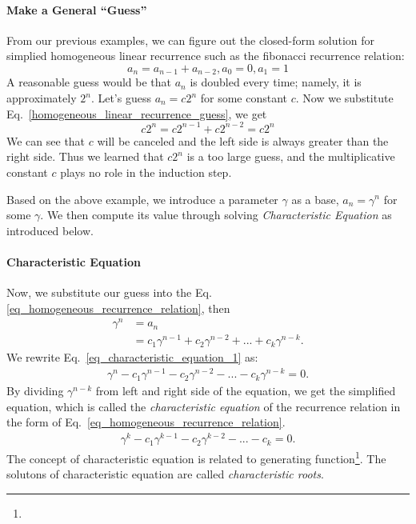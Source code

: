 \documentclass[../main.tex]{subfiles}
\begin{document}
\paragraph{Make a General ``Guess''} From our previous examples, we can figure out the closed-form solution for simplied homogeneous linear recurrence such as the fibonacci recurrence relation:
\begin{equation}
a_n = a_{n-1}+a_{n-2}, a_0=0, a_1=1
\label{homogeneous_linear_recurrence_guess}
\end{equation}
A reasonable guess would be that $a_n$ is doubled every time; namely, it is approximately $2^n$. Let's guess $a_n=c2^n$ for some constant $c$. Now we substitute Eq.~\ref{homogeneous_linear_recurrence_guess}, we get
\begin{equation}
c2^n = c2^{n-1} + c2^{n-2} = c2^n
\label{homogeneous_linear_recurrence_guess}
\end{equation}
We can see that $c$ will be canceled and the left side is always greater than the right side. Thus we learned that $c2^n$ is a too large guess, and the multiplicative constant $c$ plays no role in the induction step. 

Based on the above example, we introduce a parameter $\gamma$ as a base, $a_n = \gamma ^{n}$ for some $\gamma$. We then compute its value through solving \textit{Characteristic Equation} as introduced below. 
\paragraph{Characteristic Equation} 
Now, we substitute our guess into the Eq.\ref{eq_homogeneous_recurrence_relation}, then 
\begin{align}
    \gamma^n & = a_n \\
    &= c_1 \gamma^{n-1} + c_2 \gamma^{n-2} + ... +  c_k \gamma^{n-k}.
    \label{eq_characteristic_equation_1}
\end{align}
We rewrite Eq.~\ref{eq_characteristic_equation_1} as:
\begin{align}
    \gamma^n  - c_1 \gamma^{n-1} - c_2 \gamma^{n-2} - ... -  c_k \gamma^{n-k} = 0.
    \label{eq_characteristic_equation_2}
\end{align}
By dividing $\gamma^{n-k}$ from left and right side of the equation, we get the simplified equation, which is called the \textit{characteristic equation} of the recurrence relation in the form of Eq.~\ref{eq_homogeneous_recurrence_relation}.
\begin{align}
    \gamma^k  - c_1 \gamma^{k-1} - c_2 \gamma^{k-2} - ... -  c_k = 0.
    \label{eq_characteristic_equation_3}
\end{align}
The concept of characteristic equation is related to generating function\footnote{}.  The solutons of characteristic equation are called \textit{characteristic roots}. 
\end{document}
